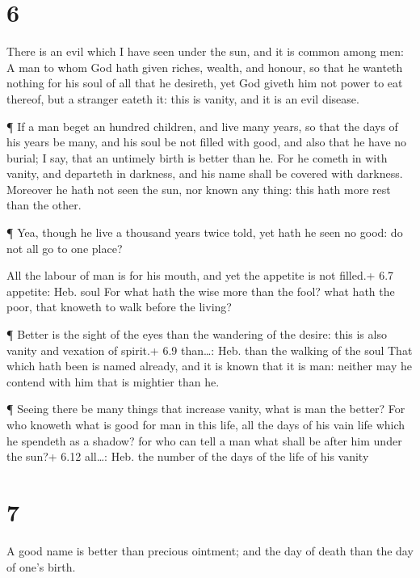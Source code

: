 \hypertarget{section-5}{%
\section{6}\label{section-5}}

 There is an evil which I have seen under the sun, and it is
common among men:  A man to whom God hath given riches,
wealth, and honour, so that he wanteth nothing for his soul of all that
he desireth, yet God giveth him not power to eat thereof, but a stranger
eateth it: this is vanity, and it is an evil disease.

 ¶ If a man beget an hundred children, and live many years,
so that the days of his years be many, and his soul be not filled with
good, and also that he have no burial; I say, that an untimely birth is
better than he.  For he cometh in with vanity, and departeth
in darkness, and his name shall be covered with darkness. 
Moreover he hath not seen the sun, nor known any thing: this hath more
rest than the other.

 ¶ Yea, though he live a thousand years twice told, yet hath
he seen no good: do not all go to one place?

 All the labour of man is for his mouth, and yet the
appetite is not filled.+ 6.7 appetite: Heb. soul  For what
hath the wise more than the fool? what hath the poor, that knoweth to
walk before the living?

 ¶ Better is the sight of the eyes than the wandering of the
desire: this is also vanity and vexation of spirit.+ 6.9 than\ldots:
Heb. than the walking of the soul  That which hath been is
named already, and it is known that it is man: neither may he contend
with him that is mightier than he.

 ¶ Seeing there be many things that increase vanity, what
is man the better?  For who knoweth what is good for man in
this life, all the days of his vain life which he spendeth as a shadow?
for who can tell a man what shall be after him under the sun?+ 6.12
all\ldots: Heb. the number of the days of the life of his vanity

\hypertarget{section-6}{%
\section{7}\label{section-6}}

 A good name is better than precious ointment; and the day
of death than the day of one's birth.

